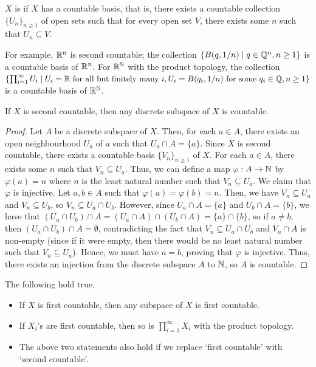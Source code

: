 \begin{definition}
    $X$ is  if $X$ has a countable basis, that is, there exists a countable collection $\{U_{n}\}_{n \geq 1}$ of open sets such that for every open set $V$, there exists some $n$ such that $U_{n} \subseteq V$.
\end{definition}

For example, $\mathbb{R}^{n}$ is second countable; the collection $\{B(q,1/n) \mid q \in \mathbb{Q}^{n}, n \geq 1\}$ is a countable basis of $\mathbb{R}^{n}$. For $\mathbb{R}^{\mathbb{N}}$ with the product topology, the collection $\{\prod_{i=1}^{\infty} U_{i} \mid U_{i} = \mathbb{R} \text{ for all but finitely many } i, U_{i} = B(q_{i},1/n) \text{ for some } q_{i} \in \mathbb{Q}, n \geq 1\}$ is a countable basis of $\mathbb{R}^{\mathbb{N}}$.

\begin{lemma}
    If $X$ is second countable, then any discrete subspace of $X$ is countable.
\end{lemma}

\begin{proof}
    Let $A$ be a discrete subspace of $X$. Then, for each $a \in A$, there exists an open neighbourhood $U_{a}$ of $a$ such that $U_{a} \cap A = \{a\}$. Since $X$ is second countable, there exists a countable basis $\{V_{n}\}_{n \geq 1}$ of $X$. For each $a \in A$, there exists some $n$ such that $V_{n} \subseteq U_{a}$. Thus, we can define a map $\varphi : A \to \mathbb{N}$ by $\varphi(a) = n$ where $n$ is the least natural number such that $V_{n} \subseteq U_{a}$. We claim that $\varphi$ is injective. Let $a,b \in A$ such that $\varphi(a) = \varphi(b) = n$. Then, we have $V_{n} \subseteq U_{a}$ and $V_{n} \subseteq U_{b}$, so $V_{n} \subseteq U_{a} \cap U_{b}$. However, since $U_{a} \cap A = \{a\}$ and $U_{b} \cap A = \{b\}$, we have that $(U_{a} \cap U_{b}) \cap A = (U_{a} \cap A) \cap (U_{b} \cap A) = \{a\} \cap \{b\}$, so if $a \neq b$, then $(U_{a} \cap U_{b}) \cap A = \emptyset$, contradicting the fact that $V_{n} \subseteq U_{a} \cap U_{b}$ and $V_{n} \cap A$ is non-empty (since if it were empty, then there would be no least natural number such that $V_{n} \subseteq U_{a}$). Hence, we must have $a = b$, proving that $\varphi$ is injective. Thus, there exists an injection from the discrete subspace $A$ to $\mathbb{N}$, so $A$ is countable.
\end{proof}

\begin{lemma}
    The following hold true.
    \begin{itemize}
        \item If $X$ is first countable, then any subspace of $X$ is first countable.
        \item If $X_{i}$'s are first countable, then so is $\prod_{i=1}^{\infty} X_{i}$ with the product topology.
        \item The above two statements also hold if we replace `first countable' with `second countable'.
    \end{itemize}
\end{lemma}

